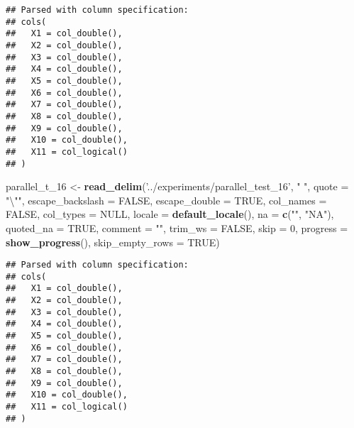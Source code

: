 \documentclass[]{article}
\newenvironment{Shaded}{\begin{snugshade}}{\end{snugshade}}
\newcommand{\KeywordTok}[1]{\textcolor[rgb]{0.13,0.29,0.53}{\textbf{#1}}}
\newcommand{\DataTypeTok}[1]{\textcolor[rgb]{0.13,0.29,0.53}{#1}}
\newcommand{\DecValTok}[1]{\textcolor[rgb]{0.00,0.00,0.81}{#1}}
\newcommand{\CharTok}[1]{\textcolor[rgb]{0.31,0.60,0.02}{#1}}
\newcommand{\StringTok}[1]{\textcolor[rgb]{0.31,0.60,0.02}{#1}}
\newcommand{\OtherTok}[1]{\textcolor[rgb]{0.56,0.35,0.01}{#1}}
\newcommand{\NormalTok}[1]{#1}
\begin{document}
\begin{verbatim}
## Parsed with column specification:
## cols(
##   X1 = col_double(),
##   X2 = col_double(),
##   X3 = col_double(),
##   X4 = col_double(),
##   X5 = col_double(),
##   X6 = col_double(),
##   X7 = col_double(),
##   X8 = col_double(),
##   X9 = col_double(),
##   X10 = col_double(),
##   X11 = col_logical()
## )
\end{verbatim}

\begin{Shaded}
\begin{Highlighting}[]
\NormalTok{parallel_t_}\DecValTok{16}\NormalTok{ <-}\StringTok{ }\KeywordTok{read_delim}\NormalTok{(}\StringTok{'../experiments/parallel_test_16'}\NormalTok{, }\StringTok{" "}\NormalTok{, }\DataTypeTok{quote =} \StringTok{"}\CharTok{\textbackslash{}"}\StringTok{"}\NormalTok{, }\DataTypeTok{escape_backslash =} \OtherTok{FALSE}\NormalTok{,}
  \DataTypeTok{escape_double =} \OtherTok{TRUE}\NormalTok{, }\DataTypeTok{col_names =} \OtherTok{FALSE}\NormalTok{, }\DataTypeTok{col_types =} \OtherTok{NULL}\NormalTok{,}
  \DataTypeTok{locale =} \KeywordTok{default_locale}\NormalTok{(), }\DataTypeTok{na =} \KeywordTok{c}\NormalTok{(}\StringTok{""}\NormalTok{, }\StringTok{"NA"}\NormalTok{), }\DataTypeTok{quoted_na =} \OtherTok{TRUE}\NormalTok{,}
  \DataTypeTok{comment =} \StringTok{""}\NormalTok{, }\DataTypeTok{trim_ws =} \OtherTok{FALSE}\NormalTok{, }\DataTypeTok{skip =} \DecValTok{0}\NormalTok{, }
 \DataTypeTok{progress =} \KeywordTok{show_progress}\NormalTok{(),}
  \DataTypeTok{skip_empty_rows =} \OtherTok{TRUE}\NormalTok{)}
\end{Highlighting}
\end{Shaded}

\begin{verbatim}
## Parsed with column specification:
## cols(
##   X1 = col_double(),
##   X2 = col_double(),
##   X3 = col_double(),
##   X4 = col_double(),
##   X5 = col_double(),
##   X6 = col_double(),
##   X7 = col_double(),
##   X8 = col_double(),
##   X9 = col_double(),
##   X10 = col_double(),
##   X11 = col_logical()
## )
\end{verbatim}
\end{document}
